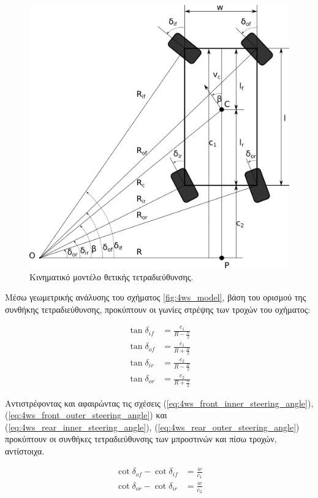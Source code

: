 {\begin{figure}[!ht]
	\centering
	\includegraphics[width=0.7\linewidth]{Chapters/Chapter2/Figures/pos_4ws_model.png}
	\caption{Κινηματικό μοντέλο θετικής τετραδιεύθυνσης.}
	\label{fig:pos_4ws_model}
\end{figure}

\bigskip
Μέσω γεωμετρικής ανάλυσης του σχήματος \ref{fig:4ws_model}, βάση του ορισμού της {συνθήκης τετραδιεύθυνσης}, προκύπτουν οι γωνίες στρέψης των τροχών του οχήματος:

\begin{align}
	\tan{\delta_{if}} &= \frac{c_1}{R-\frac{w}{2}}
	\label{eq:4ws_front_inner_steering_angle}\\
	\tan{\delta_{of}} &= \frac{c_1}{R+\frac{w}{2}}
	\label{eq:4ws_front_outer_steering_angle}\\
	\tan{\delta_{ir}} &= \frac{c_2}{R-\frac{w}{2}}
	\label{eq:4ws_rear_inner_steering_angle}\\
	\tan{\delta_{or}} &= \frac{c_2}{R+\frac{w}{2}}
	\label{eq:4ws_rear_outer_steering_angle}		
\end{align}

Aντιστρέφοντας και αφαιρώντας τις σχέσεις (\ref{eq:4ws_front_inner_steering_angle}), (\ref{eq:4ws_front_outer_steering_angle}) και (\ref{eq:4ws_rear_inner_steering_angle}), (\ref{eq:4ws_rear_outer_steering_angle}) προκύπτουν οι συνθήκες τετραδιεύθυνσης των μπροστινών και πίσω τροχών, αντίστοιχα.

\begin{align}
	\cot{\delta_{of}} - \cot{\delta_{if}} &= \frac{w}{c_1}
	\label{eq:front_4ws_condition}\\
	\cot{\delta_{or}} - \cot{\delta_{ir}} &= \frac{w}{c_2}
	\label{eq:rear_4ws_condition}
\end{align}

}
